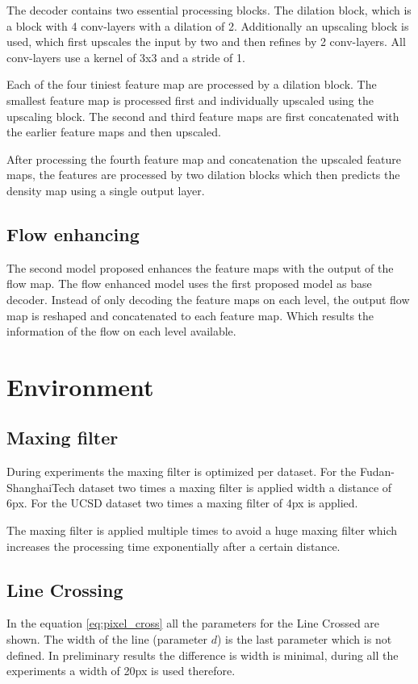 The decoder contains two essential processing blocks. The dilation block, which is a block with 4 conv-layers with a dilation of 2. Additionally an upscaling block is used, which first upscales the input by two and then refines by 2 conv-layers. All conv-layers use a kernel of 3x3 and a stride of 1.

Each of the four tiniest feature map are processed by a dilation block. The smallest feature map is processed first and individually upscaled using the upscaling block. The second and third feature maps are first concatenated with the earlier feature maps and then upscaled.

After processing the fourth feature map and concatenation the upscaled feature maps, the features are processed by two dilation blocks which then predicts the density map using a single output layer.




\subsection{Flow enhancing}
The second model proposed enhances the feature maps with the output of the flow map. The flow enhanced model uses the first proposed model as base decoder. Instead of only decoding the feature maps on each level, the output flow map is reshaped and concatenated to each feature map. Which results the information of the flow on each level available.


\section{Environment}

\subsection{Maxing filter}
During experiments the maxing filter is optimized per dataset. For the Fudan-ShanghaiTech dataset two times a maxing filter is applied width a distance of 6px. For the UCSD dataset two times a maxing filter of 4px is applied.

The maxing filter is applied multiple times to avoid a huge maxing filter which increases the processing time exponentially after a certain distance.

\subsection{Line Crossing}
In the equation \ref{eq:pixel_cross} all the parameters for the Line Crossed are shown. The width of the line (parameter $d$) is the last parameter which is not defined. In preliminary results the difference is width is minimal, during all the experiments a width of 20px is used therefore.

